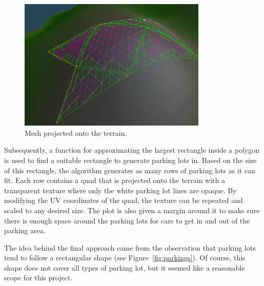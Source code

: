 \begin{figure}[H]
  \centering

  \includegraphics[width=0.8\textwidth]{figure/terrain_projector.png}
  \caption{Mesh projected onto the terrain.}

  \label{fig:methods_parking_terrain_projector}
\end{figure}

Subsequently, a function for approximating the largest rectangle inside a polygon is used to find a suitable rectangle to generate parking lots in.
Based on the size of this rectangle, the algorithm generates as many rows of parking lots as it can fit.
Each row contains a quad that is projected onto the terrain with a transparent texture where only the white parking lot lines are opaque.
By modifying the UV coordinates of the quad, the texture can be repeated and scaled to any desired size. 
The plot is also given a margin around it to make sure there is enough space around the parking lots for cars to get in and out of the parking area.

The idea behind the final approach came from the observation that parking lots tend to follow a rectangular shape (see Figure~\ref{fig:parkings}).
Of course, this shape does not cover all types of parking lot, but it seemed like a reasonable scope for this project.

